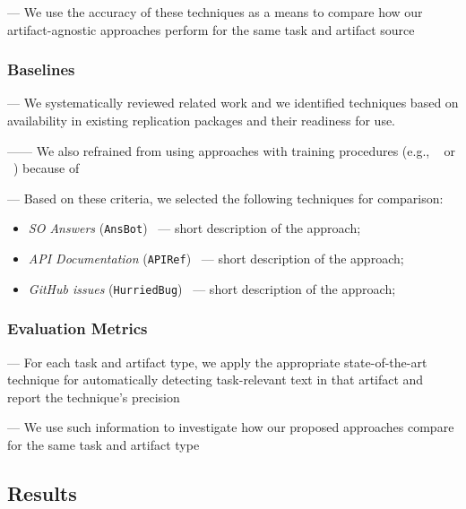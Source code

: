 --- We use the accuracy of these techniques as a means to compare how our artifact-agnostic approaches perform for the same task and artifact source



\subsubsection{Baselines}

--- We systematically reviewed related work and we identified techniques based on availability in existing replication packages and their readiness for use.

------ We also refrained from using approaches with training procedures (e.g., ~\cite{liu2020} or ~\cite{Treude2016}) because of ~\cite{Chaparro2017, fucci2019} \vspace{3mm}


--- Based on these criteria, we selected the following techniques for comparison:


\begin{itemize}[leftmargin=\parindent, font=\normalfont\itshape]
    \item \textit{SO Answers} (\texttt{AnsBot})~\cite{Xu2017} --- short description of the approach;
    
    \item \textit{API Documentation} (\texttt{APIRef})~\cite{Robillard2015} --- short description of the approach;
    
    \item \textit{GitHub issues} (\texttt{HurriedBug})~\cite{Lotufo2012} --- short description of the approach;
\end{itemize}





\subsubsection{Evaluation Metrics}

--- For each task and artifact type, we apply the appropriate state-of-the-art technique for automatically detecting task-relevant text in that artifact and report the technique's precision

--- We use such information to investigate how our proposed approaches compare for the same task and artifact type


\subsection{Results}

